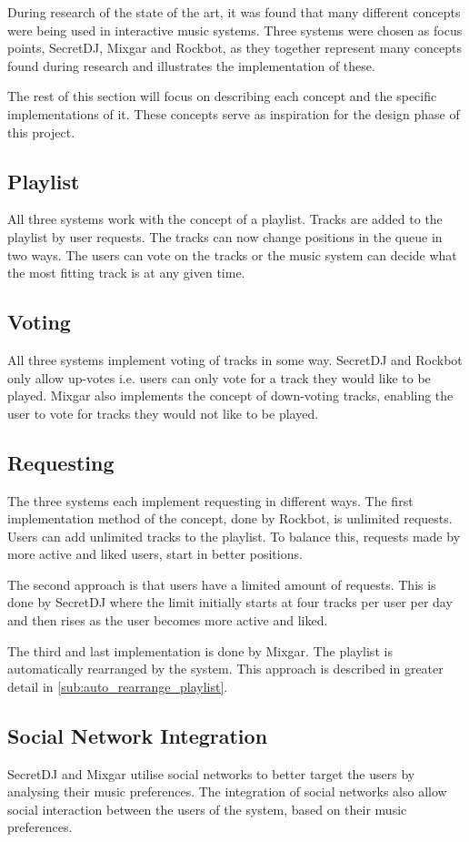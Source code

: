 During research of the state of the art, it was found that many different
concepts were being used in interactive music systems. Three systems
were chosen as focus points, SecretDJ, Mixgar and Rockbot, as they together
represent many concepts found during research and illustrates the
implementation of these.

The rest of this section will focus on describing each concept and the
specific implementations of it. These concepts serve as inspiration for
the design phase of this project.

\subsection{Playlist}
All three systems work with the concept of a playlist. Tracks are
added to the playlist by user requests. The tracks can now change
positions in the queue in two ways. The users can vote on the tracks
or the music system can decide what the most fitting track is at any 
given time.

\subsection{Voting}
All three systems implement voting of tracks in some way. SecretDJ and
Rockbot only allow up-votes i.e. users can only vote for a track they would like to be
played. Mixgar also implements the concept of down-voting
tracks, enabling the user to vote for tracks they would not like to be played.

\subsection{Requesting}
The three systems each implement requesting in different ways. The
first implementation method of the concept, done by Rockbot, is
unlimited requests. Users can add unlimited tracks to the
playlist. To balance this, requests made by more active and liked
users, start in better positions.

The second approach is that users have a limited amount of
requests. This is done by SecretDJ where the limit initially starts at
four tracks per user per day and then rises as the user becomes more
active and liked.

The third and last implementation is done by Mixgar. The playlist is
automatically rearranged by the system. This approach is described in
greater detail in \cref{sub:auto_rearrange_playlist}.

\subsection{Social Network Integration}
SecretDJ and Mixgar utilise social networks to better target the users by analysing their music preferences. The
integration of social networks also allow social interaction between the users of the system, based on their music preferences.

